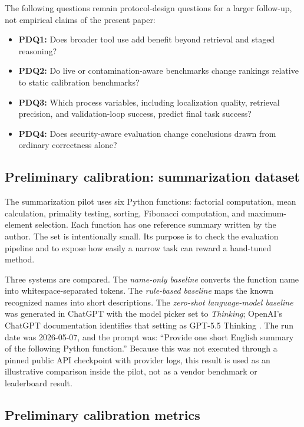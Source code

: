 \documentclass[preprint,12pt]{elsarticle}
\begin{document}
The following questions remain protocol-design questions for a larger follow-up, not empirical claims of the present paper:

\begin{itemize}[leftmargin=*]
    \item \textbf{PDQ1:} Does broader tool use add benefit beyond retrieval and staged reasoning?
    \item \textbf{PDQ2:} Do live or contamination-aware benchmarks change rankings relative to static calibration benchmarks?
    \item \textbf{PDQ3:} Which process variables, including localization quality, retrieval precision, and validation-loop success, predict final task success?
    \item \textbf{PDQ4:} Does security-aware evaluation change conclusions drawn from ordinary correctness alone?
\end{itemize}

\subsection{Preliminary calibration: summarization dataset}

The summarization pilot uses six Python functions: factorial computation, mean calculation, primality testing, sorting, Fibonacci computation, and maximum-element selection. Each function has one reference summary written by the author. The set is intentionally small. Its purpose is to check the evaluation pipeline and to expose how easily a narrow task can reward a hand-tuned method.

Three systems are compared. The \textit{name-only baseline} converts the function name into whitespace-separated tokens. The \textit{rule-based baseline} maps the known recognized names into short descriptions. The \textit{zero-shot language-model baseline} was generated in ChatGPT with the model picker set to \textit{Thinking}; OpenAI's ChatGPT documentation identifies that setting as GPT-5.5 Thinking \cite{openai2026gpt55}. The run date was 2026-05-07, and the prompt was: ``Provide one short English summary of the following Python function.'' Because this was not executed through a pinned public API checkpoint with provider logs, this result is used as an illustrative comparison inside the pilot, not as a vendor benchmark or leaderboard result.

\subsection{Preliminary calibration metrics}
\end{document}
